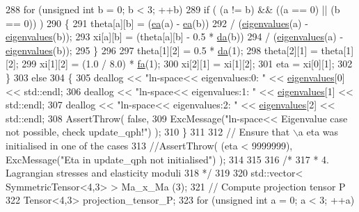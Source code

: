 \begin{DoxyCode}
288             \textcolor{keywordflow}{for} (\textcolor{keywordtype}{unsigned} \textcolor{keywordtype}{int} b = 0; b < 3; ++b)
289                 \textcolor{keywordflow}{if} ( (a != b) && ((a == 0) || (b == 0)) )
290                 \{
291                     theta[a][b] = (\hyperlink{classln__space_add32551f879560be55f3d61a5a368ab4}{ea}(a) - \hyperlink{classln__space_add32551f879560be55f3d61a5a368ab4}{ea}(b))
292                                   / (\hyperlink{classln__space_aad33c1f308694e2801bbea7730d3b9c6}{eigenvalues}(a) - \hyperlink{classln__space_aad33c1f308694e2801bbea7730d3b9c6}{eigenvalues}(b));
293                     xi[a][b] = (theta[a][b] - 0.5 * \hyperlink{classln__space_a8d65915eb5122e3c5941b7163af57306}{da}(b))
294                                / (\hyperlink{classln__space_aad33c1f308694e2801bbea7730d3b9c6}{eigenvalues}(a) - \hyperlink{classln__space_aad33c1f308694e2801bbea7730d3b9c6}{eigenvalues}(b));
295                 \}
296 
297         theta[1][2] = 0.5 * \hyperlink{classln__space_a8d65915eb5122e3c5941b7163af57306}{da}(1);
298         theta[2][1] = theta[1][2];
299         xi[1][2] = (1.0 / 8.0) * \hyperlink{classln__space_aff1eab9675707d7aeed154aadb11adf4}{fa}(1);
300         xi[2][1] = xi[1][2];
301         eta = xi[0][1];
302      \}
303      \textcolor{keywordflow}{else}
304      \{
305         deallog << \textcolor{stringliteral}{"ln-space<< eigenvalues:0: "} << \hyperlink{classln__space_aad33c1f308694e2801bbea7730d3b9c6}{eigenvalues}[0] << std::endl;
306         deallog << \textcolor{stringliteral}{"ln-space<< eigenvalues:1: "} << \hyperlink{classln__space_aad33c1f308694e2801bbea7730d3b9c6}{eigenvalues}[1] << std::endl;
307         deallog << \textcolor{stringliteral}{"ln-space<< eigenvalues:2: "} << \hyperlink{classln__space_aad33c1f308694e2801bbea7730d3b9c6}{eigenvalues}[2] << std::endl;
308         AssertThrow( \textcolor{keyword}{false},
309                      ExcMessage(\textcolor{stringliteral}{"ln-space<< Eigenvalue case not possible, check update\_qph!"}) );
310      \}
311 
312     \textcolor{comment}{// Ensure that \(\backslash\)a eta was initialised in one of the cases}
313      \textcolor{comment}{//AssertThrow( (eta < 9999999), ExcMessage("Eta in update\_qph not initialised") );}
314 
315 
316     \textcolor{comment}{/*}
317 \textcolor{comment}{     * 4. Lagrangian stresses and elasticity moduli}
318 \textcolor{comment}{     */}
319 
320      std::vector< SymmetricTensor<4,3> > Ma\_x\_Ma (3);
321     \textcolor{comment}{// Compute projection tensor P}
322      Tensor<4,3> projection\_tensor\_P;
323      \textcolor{keywordflow}{for} (\textcolor{keywordtype}{unsigned} \textcolor{keywordtype}{int} a = 0; a < 3; ++a)

\end{DoxyCode}
